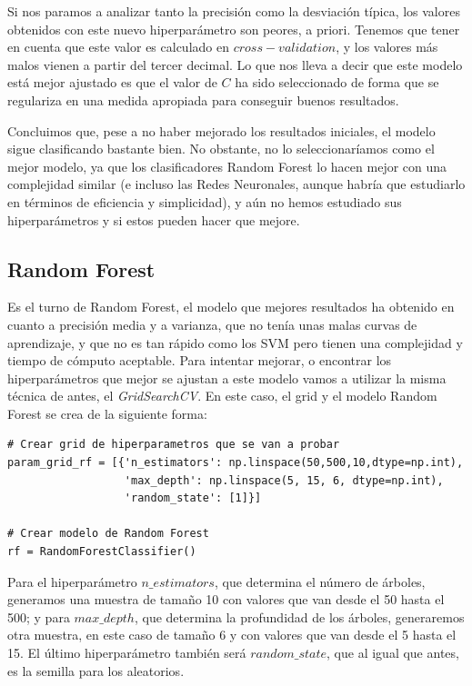 \documentclass[11pt,a4paper]{article}
\begin{document}
Si nos paramos a analizar tanto la precisión como la desviación típica, los valores obtenidos con este nuevo hiperparámetro son peores, a priori. Tenemos que tener en cuenta que este valor es calculado en $cross-validation$, y los valores más malos vienen a partir del tercer decimal. Lo que nos lleva a decir que este modelo está mejor ajustado es que el valor de $C$ ha sido seleccionado de forma que se regulariza en una medida apropiada para conseguir buenos resultados.

Concluimos que, pese a no haber mejorado los resultados iniciales, el modelo sigue clasificando bastante bien. No obstante, no lo seleccionaríamos como el mejor modelo, ya que los clasificadores Random Forest lo hacen mejor con una complejidad similar (e incluso las Redes Neuronales, aunque habría que estudiarlo en términos de eficiencia y simplicidad), y aún no hemos estudiado sus hiperparámetros y si estos pueden hacer que mejore.

\subsection{Random Forest}

Es el turno de Random Forest, el modelo que mejores resultados ha obtenido en cuanto a precisión media y a varianza, que no tenía unas malas curvas de aprendizaje, y que no es tan rápido como los SVM pero tienen una complejidad y tiempo de cómputo aceptable. Para intentar mejorar, o encontrar los hiperparámetros que mejor se ajustan a este modelo vamos a utilizar la misma técnica de antes, el \textit{GridSearchCV}. En este caso, el grid y el modelo Random Forest se crea de la siguiente forma:

\begin{lstlisting}
# Crear grid de hiperparametros que se van a probar
param_grid_rf = [{'n_estimators': np.linspace(50,500,10,dtype=np.int),
                  'max_depth': np.linspace(5, 15, 6, dtype=np.int),
                  'random_state': [1]}]

# Crear modelo de Random Forest
rf = RandomForestClassifier()

\end{lstlisting}

Para el hiperparámetro $n\_estimators$, que determina el número de árboles, generamos una muestra de tamaño 10 con valores que van desde el 50 hasta el 500; y para $max\_depth$, que determina la profundidad de los árboles, generaremos otra muestra, en este caso de tamaño 6 y con valores que van desde el 5 hasta el 15. El último hiperparámetro también será $random\_state$, que al igual que antes, es la semilla para los aleatorios.
\end{document}
